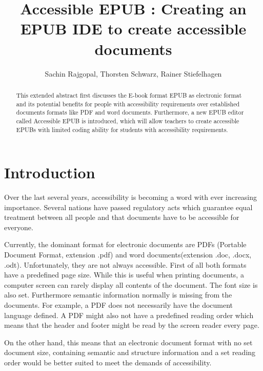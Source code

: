 \documentclass{llncs}
\title{Accessible EPUB : Creating an EPUB IDE to create accessible documents}
\author{Sachin Rajgopal\inst{1}, Thorsten Schwarz\inst{1}, Rainer Stiefelhagen\inst{1}}
\institute{Karlsruhe Institute of Technology}
\date{}
\begin{document}
\maketitle

\begin{abstract}
	This extended abstract first discusses the E-book format EPUB as electronic format and its potential benefits for people with accessibility requirements over established documents formats like PDF and word documents. Furthermore, a new EPUB editor called Accessible EPUB is introduced, which will allow teachers to create accessible EPUBs with limited coding ability for students with accessibility requirements. 
\end{abstract}

\section{Introduction}
Over the last several years, accessibility is becoming a word with ever increasing importance. Several nations have passed regulatory acts which guarantee equal treatment between all people and that documents have to be accessible for everyone.

Currently, the dominant format for electronic documents are PDFs (Portable Document Format, extension .pdf) and word documents(extension .doc, .docx, .odt). Unfortunately, they are not always accessible. First of all both formats have a predefined page size. While this is useful when printing documents, a computer screen can rarely display all contents of the document.\cite{EPUBzone} The font size is also set.  Furthermore semantic information normally is missing from the documents. For example, a PDF does not necessarily have the document language defined. A PDF might also not have a predefined reading order which means that the header and footer might be read by the screen reader every page. 

On the other hand, this means that an electronic document format with no set document size, containing semantic and structure information and a set reading order would be better suited to meet the demands of accessibility.\cite{EPUBzone}
\end{document}
